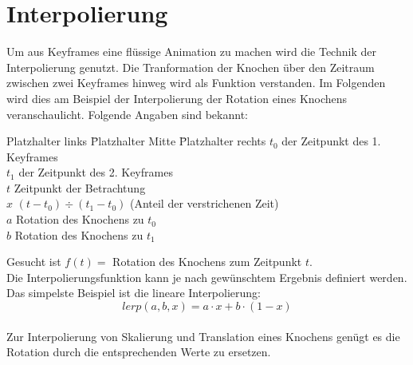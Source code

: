 \section{Interpolierung}

%
Um aus Keyframes eine flüssige Animation zu machen wird die Technik der Interpolierung genutzt. Die Tranformation der Knochen über den Zeitraum zwischen zwei Keyframes hinweg wird als Funktion verstanden. Im Folgenden wird dies am Beispiel der Interpolierung der Rotation eines Knochens veranschaulicht. Folgende Angaben sind bekannt:
\begin{tabbing}
	Platzhalter links \quad \= Platzhalter Mitte \quad \= Platzhalter rechts \kill
	$t_0$   \> der Zeitpunkt des 1. Keyframes 	\\
	$t_1$   \> der Zeitpunkt des 2. Keyframes	\\
	$t$		\> Zeitpunkt der Betrachtung		\\
	$x$ 	\> $(t-t_0) \div (t_1 - t_0)$ (Anteil der verstrichenen Zeit)		\\
	$a$     \> Rotation des Knochens zu $t_0$	\\
	$b$     \> Rotation des Knochens zu $t_1$
\end{tabbing}
Gesucht ist $f(t) =$ Rotation des Knochens zum Zeitpunkt $t$.\\
Die Interpolierungsfunktion kann je nach gewünschtem Ergebnis definiert werden. Das simpelste Beispiel ist die lineare Interpolierung:\\
\begin{equation}
	lerp(a,b,x) = a \cdot x + b \cdot (1-x) 
\end{equation}\\
%
Zur Interpolierung von Skalierung und Translation eines Knochens genügt es die Rotation durch die entsprechenden Werte zu ersetzen. 
